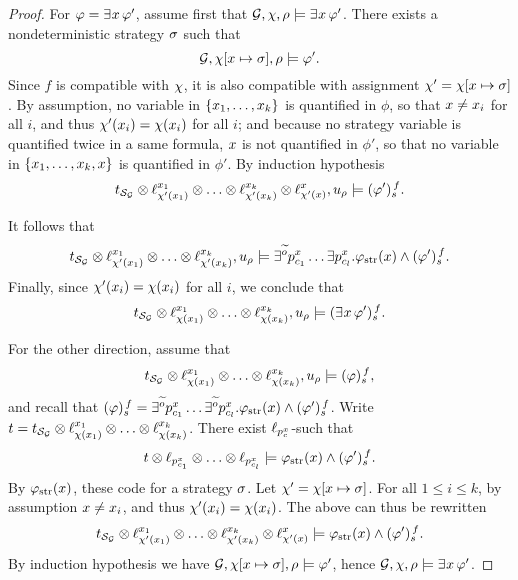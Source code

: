 \begin{proof}
\halfline
For $\phi=\Estratnd\phi'$, assume first that
$\CGS,\assign,{\fplay}\models\Estratnd\phi'$. There exists a
nondeterministic strategy $\strat$ such that
 \[\CGS,\assign[\var\mapsto \strat],\fplay\models \phi'.\] Since $f$ is
 compatible with $\assign$, it is also compatible with assignment
 $\assign'=\assign[\var\mapsto \strat]$. By assumption, no variable in
 $\{\var_1,\ldots,\var_k\}$ is quantified in $\phi$, so that $\var\neq
 \var_i$ for all $i$, and thus $\assign'(\var_i)=\assign(\var_i)$ for
 all $i$; and because no strategy variable is
 quantified twice in a same formula,
 $\var$ is not quantified in $\phi'$, so that no variable in
 $\{\var_1,\ldots,\var_k,\var\}$ is quantified in $\phi'$.
 By induction hypothesis 
   \[\unfold[\KS_{\CGS}]{\sstate_{\pos_\init}}\prodlab
   \stratlab[\assign'(\var_1)]{\var_1}\prodlab\ldots \prodlab
   \stratlab[\assign'(\var_k)]{\var_k}\prodlab   \stratlab[\assign'(\var)]{\var},\noeud_{\fplay}
   \modelst \tr[f]{\phi'}.\]

It follows that   \[\unfold[\KS_{\CGS}]{\sstate_{\pos_\init}}\prodlab
  \stratlab[\assign'(\var_1)]{\var_1}\prodlab\ldots \prodlab
   \stratlab[\assign'(\var_k)]{\var_k},\noeud_{\fplay}
   \modelst \exists^{\trobs{\obs}} p_{\mov_{1}}^{\var}\ldots
   \exists   p_{\mov_{\maxmov}}^{\var}. \phistrat\et\tr[f]{\phi'}.\]
 Finally, since $\assign'(\var_i)=\assign(\var_i)$ for all $i$, we
 conclude that 
 \[\unfold[\KS_{\CGS}]{\sstate_{\pos_\init}}\prodlab
   \stratlab[\assign(\var_1)]{\var_1}\prodlab\ldots \prodlab
   \stratlab[\assign(\var_k)]{\var_k},\noeud_{\fplay}
   \modelst \tr[f]{\Estratnd\phi'}.\]

For the other direction, assume
that
\[\unfold[\KS_{\CGS}]{\sstate_{\pos_\init}}\prodlab
  \stratlab[\assign(\var_1)]{\var_1}\prodlab\ldots \prodlab
  \stratlab[\assign(\var_k)]{\var_k},\noeud_{\fplay} \modelst
  \tr[f]{\phi},\] and recall that
$\tr[f]{\phi}=\exists^{\trobs{\obs}} p_{\mov_{1}}^{\var}\ldots
\exists^{\trobs{\obs}}
p_{\mov_{\maxmov}}^{\var}. \phistrat\et\tr[f]{\phi'}$.  Write
$\ltree=\unfold[\KS_{\CGS}]{\sstate_{\pos_\init}}\prodlab
\stratlab[\assign(\var_1)]{\var_1}\prodlab\ldots \prodlab
\stratlab[\assign(\var_k)]{\var_k}$. There exist
 $\plab[{p_\act^\var}]$- such that
\[\ltree\prodlab  \plab[{p_{\act_1}^\var}]\prodlab\ldots\prodlab \plab[{p_{\act_\maxmov}^\var}]
  \modelst \phistrat\et\tr[f]{\phi'}.\]
By $\phistrat$, these   
 code for a strategy $\strat$. Let
 $\assign'=\assign[\var\mapsto \strat]$. For all $1\leq i\leq k$, by
 assumption $\var\neq \var_i$, and thus $\assign'(\var_i)=\assign(\var_i)$.
 The above can thus be rewritten
 \[\unfold[\KS_{\CGS}]{\sstate_{\pos_\init}}\prodlab
\stratlab[\assign'(\var_1)]{\var_1}\prodlab\ldots \prodlab
\stratlab[\assign'(\var_k)]{\var_k}\prodlab  \stratlab[\assign'(\var)]{\var}
  \modelst \phistrat\et\tr[f]{\phi'}.\]
 By induction hypothesis we have
$\CGS,\assign[\var\mapsto
\strat],\fplay\models \phi'$, hence $\CGS,\assign,\fplay\models
\Estratnd\phi'$.


\end{proof}
